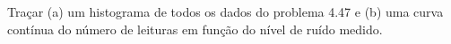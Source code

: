Traçar (a) um histograma de todos os dados do problema 4.47 e (b) uma curva contínua do número de leituras em função do nível de ruído medido.

